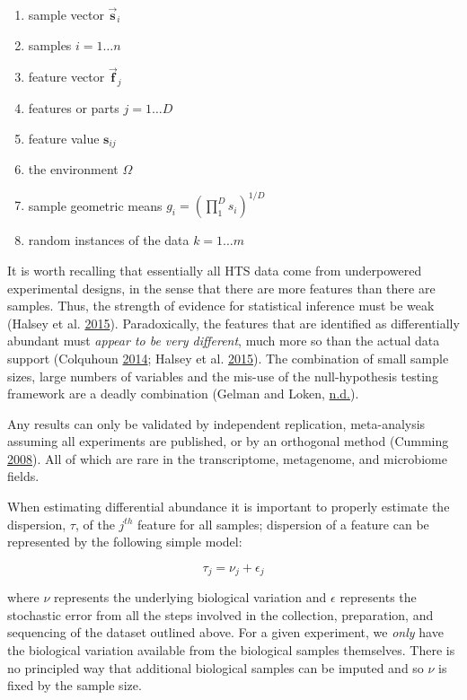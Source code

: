 \documentclass[onecolumn]{book}
\providecommand{\tightlist}{%
  \setlength{\itemsep}{0pt}\setlength{\parskip}{0pt}}
\newcommand{\vect}[1]{\vec{\textbf{#1}}}
\theoremstyle{definition}
\theoremstyle{definition}
\theoremstyle{definition}
\theoremstyle{remark}
\begin{document}
\begin{enumerate}
\def\labelenumi{\arabic{enumi}.}
\tightlist
\item
  sample vector \(\vect{s}_i\)
\item
  samples \(i=1 \ldots n\)
\item
  feature vector \(\vect{f}_j\)
\item
  features or parts \(j=1 \ldots D\)
\item
  feature value \(\textbf{s}_{ij}\)
\item
  the environment \(\Omega\)
\item
  sample geometric means \(g_i= ( \prod_{1}^{D} s_i )^{1/D}\)
\item
  random instances of the data \(k=1 \ldots m\)
\end{enumerate}

It is worth recalling that essentially all HTS data come from
underpowered experimental designs, in the sense that there are more
features than there are samples. Thus, the strength of evidence for
statistical inference must be weak (Halsey et al.
\protect\hyperlink{ref-Halsey:2015aa}{2015}). Paradoxically, the
features that are identified as differentially abundant must
\emph{appear to be very different}, much more so than the actual data
support (Colquhoun \protect\hyperlink{ref-Colquhoun:2014aa}{2014};
Halsey et al. \protect\hyperlink{ref-Halsey:2015aa}{2015}). The
combination of small sample sizes, large numbers of variables and the
mis-use of the null-hypothesis testing framework are a deadly
combination (Gelman and Loken,
\protect\hyperlink{ref-forking:2013}{n.d.}).

Any results can only be validated by independent replication,
meta-analysis assuming all experiments are published, or by an
orthogonal method (Cumming
\protect\hyperlink{ref-Cumming:2008aa}{2008}). All of which are rare in
the transcriptome, metagenome, and microbiome fields.

When estimating differential abundance it is important to properly
estimate the dispersion, \(\tau\), of the \(j^{th}\) feature for all
samples; dispersion of a feature can be represented by the following
simple model:

\begin{equation}
    \tau_{j} = \nu_j + \epsilon_j
\label{eq:dispersion}
\end{equation}

where \(\nu\) represents the underlying biological variation and
\(\epsilon\) represents the stochastic error from all the steps involved
in the collection, preparation, and sequencing of the dataset outlined
above. For a given experiment, we \emph{only} have the biological
variation available from the biological samples themselves. There is no
principled way that additional biological samples can be imputed and so
\(\nu\) is fixed by the sample size.
\end{document}
